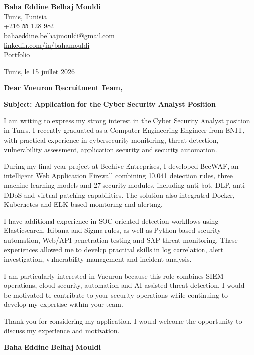 \documentclass[a4paper,11pt]{article}
\begin{document}
\begin{flushright}
{\bfseries Baha Eddine Belhaj Mouldi}\\
Tunis, Tunisia\\
+216 55 128 982\\
\href{mailto:bahaeddine.belhajmouldi@gmail.com}{bahaeddine.belhajmouldi@gmail.com}\\
\href{https://linkedin.com/in/bahamouldi}{linkedin.com/in/bahamouldi}\\
\href{https://bahamouldi.github.io/portfolio/}{Portfolio}
\end{flushright}

\vspace{0.8cm}

\begin{flushleft}
Tunis, le 15 juillet 2026

\vspace{0.8cm}

{\bfseries Dear Vneuron Recruitment Team,}

\vspace{0.6cm}

{\bfseries Subject: Application for the Cyber Security Analyst Position}
\end{flushleft}

\vspace{0.6cm}

I am writing to express my strong interest in the Cyber Security Analyst position in Tunis. I recently graduated as a Computer Engineering Engineer from ENIT, with practical experience in cybersecurity monitoring, threat detection, vulnerability assessment, application security and security automation.

During my final-year project at Beehive Entreprises, I developed BeeWAF, an intelligent Web Application Firewall combining 10,041 detection rules, three machine-learning models and 27 security modules, including anti-bot, DLP, anti-DDoS and virtual patching capabilities. The solution also integrated Docker, Kubernetes and ELK-based monitoring and alerting.

I have additional experience in SOC-oriented detection workflows using Elasticsearch, Kibana and Sigma rules, as well as Python-based security automation, Web/API penetration testing and SAP threat monitoring. These experiences allowed me to develop practical skills in log correlation, alert investigation, vulnerability management and incident analysis.

I am particularly interested in Vneuron because this role combines SIEM operations, cloud security, automation and AI-assisted threat detection. I would be motivated to contribute to your security operations while continuing to develop my expertise within your team.

Thank you for considering my application. I would welcome the opportunity to discuss my experience and motivation.

\vspace{0.8cm}

\begin{flushright}
{\bfseries Baha Eddine Belhaj Mouldi}
\end{flushright}
\end{document}
